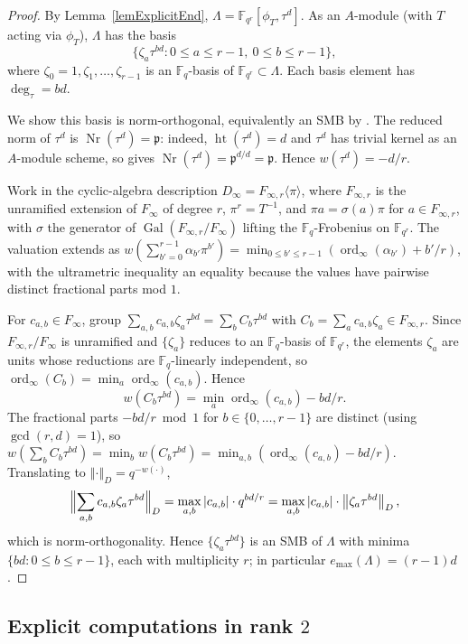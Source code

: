 \documentclass[12pt]{amsart}
\theoremstyle{definition}
\theoremstyle{remark}
\numberwithin{equation}{section}
\numberwithin{thm}{section}
\DeclareMathOperator{\Ht}{ht}
\DeclareMathOperator{\ord}{ord}
\DeclareMathOperator{\Gal}{Gal}
\DeclareMathOperator{\Nr}{Nr}
\newcommand{\fp}{\mathfrak{p}}
\newcommand{\F}{\mathbb{F}}
\newcommand{\Fi}{F_\infty}
\newcommand{\La}{\Lambda}
\newcommand{\norm}[1]{\left\Vert#1\right\Vert}
\newcommand{\abs}[1]{\left|#1\right|}
\begin{document}
\begin{proof}
	By Lemma~\ref{lemExplicitEnd}, $\La = \F_{q^r}[\phi_T,\tau^d]$. As an $A$-module (with $T$ acting via $\phi_T$), $\La$ has the basis
	\[
	\{\zeta_a\tau^{bd} : 0\leq a\leq r-1,\ 0\leq b\leq r-1\},
	\]
	where $\zeta_0 = 1,\zeta_1,\ldots,\zeta_{r-1}$ is an $\F_q$-basis of $\F_{q^r}\subset \La$. Each basis element has $\deg_\tau = bd$.
	
	We show this basis is norm-orthogonal, equivalently an SMB by \cite[Lem.~4.2]{Taguchi}. The reduced norm of $\tau^d$ is $\Nr(\tau^d) = \fp$: indeed, $\Ht(\tau^d) = d$ and $\tau^d$ has trivial kernel as an $A$-module scheme, so \cite[Lem.~3.10]{Gekeler91} gives $\Nr(\tau^d) = \fp^{d/d} = \fp$. Hence $w(\tau^d) = -d/r$.
	
	Work in the cyclic-algebra description $D_\infty = F_{\infty,r}\langle\pi\rangle$, where $F_{\infty,r}$ is the unramified extension of $\Fi$ of degree $r$, $\pi^r = T^{-1}$, and $\pi a = \sigma(a)\pi$ for $a\in F_{\infty,r}$, with $\sigma$ the generator of $\Gal(F_{\infty,r}/\Fi)$ lifting the $\F_q$-Frobenius on $\F_{q^r}$. The valuation extends as $w(\sum_{b'=0}^{r-1} \alpha_{b'}\pi^{b'}) = \min_{0\leq b'\leq r-1}(\ord_\infty(\alpha_{b'}) + b'/r)$, with the ultrametric inequality an equality because the values have pairwise distinct fractional parts mod $1$.
	
	For $c_{a,b}\in \Fi$, group $\sum_{a,b}c_{a,b}\zeta_a\tau^{bd} = \sum_b C_b\tau^{bd}$ with $C_b = \sum_a c_{a,b}\zeta_a \in F_{\infty,r}$. Since $F_{\infty,r}/\Fi$ is unramified and $\{\zeta_a\}$ reduces to an $\F_q$-basis of $\F_{q^r}$, the elements $\zeta_a$ are units whose reductions are $\F_q$-linearly independent, so $\ord_\infty(C_b) = \min_a\ord_\infty(c_{a,b})$. Hence
	\[
	w(C_b\tau^{bd}) = \min_a\ord_\infty(c_{a,b}) - bd/r.
	\]
	The fractional parts $-bd/r \bmod 1$ for $b\in\{0,\ldots,r-1\}$ are distinct (using $\gcd(r,d) = 1$), so $w(\sum_b C_b\tau^{bd}) = \min_b w(C_b\tau^{bd}) = \min_{a,b}(\ord_\infty(c_{a,b}) - bd/r)$. Translating to $\norm{\cdot}_D = q^{-w(\cdot)}$,
	\[
	\Bigl\|\sum_{a,b}c_{a,b}\zeta_a\tau^{bd}\Bigr\|_D = \max_{a,b}\abs{c_{a,b}}\cdot q^{bd/r} = \max_{a,b}\abs{c_{a,b}}\cdot \norm{\zeta_a\tau^{bd}}_D,
	\]
	which is norm-orthogonality. Hence $\{\zeta_a\tau^{bd}\}$ is an SMB of $\La$ with minima $\{bd:0\leq b\leq r-1\}$, each with multiplicity $r$; in particular $e_{\max}(\La) = (r-1)d$.
\end{proof}

\subsection{Explicit computations in rank \texorpdfstring{$2$}{2}}\label{ssCompBM}
\end{document}
